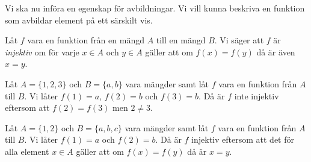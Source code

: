 Vi ska nu införa en egenskap för avbildningar.
Vi vill kunna beskriva en funktion som avbildar element på ett särskilt vis.
\begin{definition}\label{def:Injektiv}
  Låt \(f\) vara en funktion från en mängd \(A\) till en mängd \(B\).
  Vi säger att \(f\) är \emph{injektiv} om för varje \(x\in A\) och \(y\in
  A\) gäller att om \(f(x)=f(y)\) då är även \(x=y\).
\end{definition}
\begin{example}\label{ex:Surjektiv}
  Låt \(A=\{1,2,3\}\) och \(B=\{a,b\}\) vara mängder samt låt \(f\) vara en
  funktion från \(A\) till \(B\).
  Vi låter \(f(1)=a\), \(f(2)=b\) och \(f(3)=b\).
  Då är \(f\) inte injektiv eftersom att \(f(2)=f(3)\) men \(2\neq 3\).
\end{example}
\begin{example}\label{ex:Injektiv}
  Låt \(A=\{1,2\}\) och \(B=\{a,b,c\}\) vara mängder samt låt \(f\) vara en
  funktion från \(A\) till \(B\).
  Vi låter \(f(1)=a\) och \(f(2)=b\).
  Då är \(f\) injektiv eftersom att det för alla element \(x\in A\) gäller
  att om \(f(x)=f(y)\) då är \(x=y\).
\end{example}

